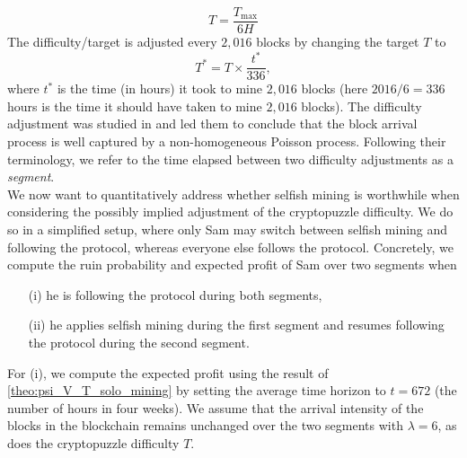 \[
T = \frac{T_{\max}}{6H}
\] 
The difficulty/target is adjusted every $2,016$ blocks by changing the target $T$ to 
$$
T^\ast = T\times \frac{t^\ast}{336},
$$
where $t^\ast$ is the time (in hours) it took to mine $2,016$ blocks (here $2016/6=336$ hours is the time it should have taken to mine $2,016$ blocks). The difficulty adjustment was studied in \citet{Bowden2020} and led them to conclude that the block arrival process is well captured by a non-homogeneous Poisson process. Following their terminology, we refer to the time elapsed between two difficulty adjustments as a \textit{segment}.\\

\noindent We now want to quantitatively address whether selfish mining is worthwhile when considering the possibly implied adjustment of the cryptopuzzle difficulty. We do so in a simplified setup, where only Sam may switch between selfish mining and following the protocol, whereas everyone else follows the protocol. Concretely, we compute the ruin probability and expected profit of Sam over two segments when
\begin{enumerate}
\item[(i)]  he is following the protocol during both segments,
\item[(ii)] he applies selfish mining during the first segment and resumes following the protocol during the second segment. 
\end{enumerate}

\noindent For (i), we compute the expected profit using the result of \cref{theo:psi_V_T_solo_mining} by setting the average time horizon to $t = 672$ (the number of hours in four weeks). We assume that the arrival intensity of the blocks in the blockchain remains unchanged over the two segments with $\lambda = 6$, as does the cryptopuzzle difficulty $T$.\\

